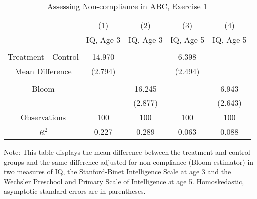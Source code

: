 \begin{table}[H] 
\begin{threeparttable}
\caption{Assessing Non-compliance in ABC, Exercise 1}
\label{table:nc1}
\centering 
\begin{tabular}{ccccc} \toprule
 & (1) & (2) & (3) & (4) \\
 & IQ, Age 3 & IQ, Age 3  & IQ, Age 5 & IQ, Age 5 \\ \midrule
 &  &  & & \\
Treatment - Control & 14.970 &  & 6.398 &  \\
 Mean Difference & (2.794) &  & (2.494) &  \\
  &  &  & & \\
Bloom &  & 16.245 &  & 6.943 \\
 &  & (2.877) &  & (2.643) \\ \midrule
Observations & 100 & 100 & 100 & 100  \\
 $R^2$ & 0.227 & 0.289 & 0.063 & 0.088 \\ \bottomrule
 \end{tabular}
\begin{tablenotes}
\footnotesize
\item Note: This table displays the mean difference between the treatment and control groups and the same difference adjusted for non-compliance (Bloom estimator) in two measures of IQ, the Stanford-Binet Intelligence Scale at age 3 and the Wechsler Preschool and Primary Scale of Intelligence at age 5. Homoskedastic, asymptotic standard errors are in parentheses.
\end{tablenotes}
\end{threeparttable}
\end{table}
